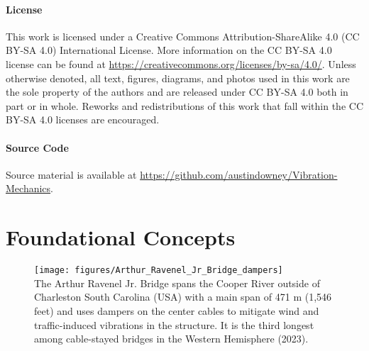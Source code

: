 \documentclass[12pt,letter]{article}
\begin{document}
\pagebreak

\subsection{License}
This work is licensed under a Creative Commons Attribution-ShareAlike 4.0 (CC BY-SA 4.0) International License. More information on the CC BY-SA 4.0 license can be found at  \url{https://creativecommons.org/licenses/by-sa/4.0/}. Unless otherwise denoted, all text, figures, diagrams, and photos used in this work are the sole property of the authors and are released under CC BY-SA 4.0 both in part or in whole. Reworks and redistributions of this work that fall within the CC BY-SA 4.0 licenses are encouraged.

\subsection{Source Code}
Source material is available at \url{https://github.com/austindowney/Vibration-Mechanics}.








\setcounter{secnumdepth}{3} %
\setcounter{page}{1}


\part{Foundational Concepts}

\begin{figure}[H]
	\centering
	\texttt{[image: figures/Arthur\_Ravenel\_Jr\_Bridge\_dampers]} \\
	The Arthur Ravenel Jr. Bridge spans the Cooper River outside of Charleston South Carolina (USA) with a main span of 471 m (1,546 feet) and uses dampers on the center cables to mitigate wind and traffic-induced vibrations in the structure. It is the third longest among cable-stayed bridges in the Western Hemisphere (2023).
\end{figure}



\pagebreak

\graphicspath{{Chapter_1_fundamentals_of_vibrations/}} 

\end{document}
